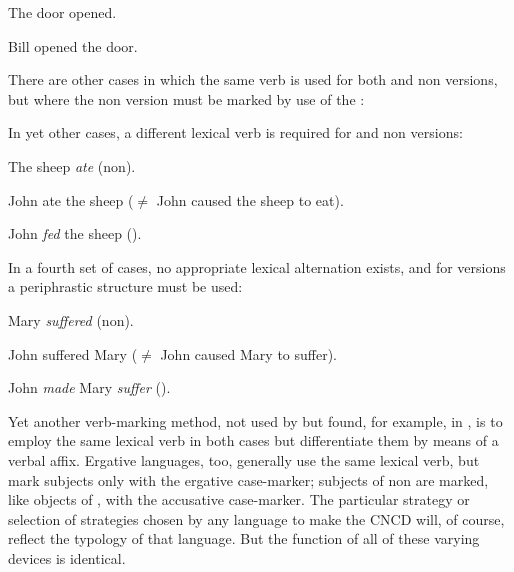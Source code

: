 \ea\label{ex:3:65}
 The door opened.
\z

\ea\label{ex:3:66}
 Bill opened the door.
\z

There are other cases in which the same verb is used for both  and non versions, but where the non version must be marked by use of the :

\z


\z

\z

In yet other cases, a different lexical verb is required for  and non versions:

\ea\label{ex:3:70}
 The sheep \textit{ate} (non).
\z

\ea\label{ex:3:71}
 John ate the sheep ($\neq$ John caused the sheep to eat).
\z

\ea\label{ex:3:72}
 John \textit{fed} the sheep (). 
\z

In a fourth set of cases, no appropriate lexical alternation exists, and for  versions a periphrastic structure must be used:

\ea\label{ex:3:73}
 Mary \textit{suffered} (non).
\z

\ea\label{ex:3:74}
John suffered Mary ($\neq$ John caused Mary to suffer).
\z

\ea\label{ex:3:75}
 John \textit{made} Mary \textit{suffer} (). 
\z

Yet another verb-marking method, not used by  but found, for example, in , is to employ the same lexical verb in both cases but differentiate them by means of a verbal affix. Ergative languages, too, generally use the same lexical verb, but mark  subjects only with the ergative case-marker; subjects of non are marked, like objects of , with the accusative case-marker. The particular strategy or selection of strategies chosen by any language to make the CNCD will, of course, reflect the typology of that language. But the function of all of these varying devices is identical.

